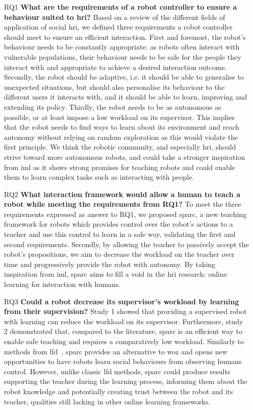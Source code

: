 \begin{itemize}
	\item [RQ1] \textbf{What are the requirements of a robot controller to ensure a behaviour suited to \gls{hri}?} 
	Based on a review of the different fields of application of social \gls{hri}, we defined three requirements a robot controller should meet to ensure an efficient interaction. First and foremost, the robot's behaviour needs to be constantly appropriate: as robots often interact with vulnerable populations, their behaviour needs to be safe for the people they interact with and appropriate to achieve a desired interaction outcome. Secondly, the robot should be adaptive, i.e. it should be able to generalise to unexpected situations, but should also personalise its behaviour to the different users it interacts with, and it should be able to learn, improving and extending its policy. Thirdly, the robot needs to be as autonomous as possible, or at least impose a low workload on its supervisor. This implies that the robot needs to find ways to learn about its environment and reach autonomy without relying on random exploration as this would violate the first principle. We think the robotic community, and especially \gls{hri}, should strive toward more autonomous robots, and could take a stronger inspiration from \gls{iml} as it shows strong promises for teaching robots and could enable them to learn complex tasks such as interacting with people.
	
	\item [RQ2] \textbf{What interaction framework would allow a human to teach a robot while meeting the requirements from RQ1?}
	To meet the three requirements expressed as answer to RQ1, we proposed \gls{sparc}, a new teaching framework for robots which provides control over the robot's actions to a teacher and use this control to learn in a safe way, validating the first and second requirements. Secondly, by allowing the teacher to passively accept the robot's propositions, we aim to decrease the workload on the teacher over time and progressively provide the robot with autonomy. By taking inspiration from \gls{iml}, \gls{sparc} aims to fill a void in the \gls{hri} research: online learning for interaction with humans.
	
	\item [RQ3] \textbf{Could a robot decrease its supervisor's workload by learning from their supervision?}
	Study 1 showed that providing a supervised robot with learning can reduce the workload on its supervisor. Furthermore, study 2 demonstrated that, compared to the literature, \gls{sparc} is an efficient way to enable safe teaching and requires a comparatively low workload. Similarly to methods from \gls{lfd}~\citep{liu2014train,sequeira2016discovering}, \gls{sparc} provides an alternative to \gls{woz} and opens new opportunities to have robots learn social behaviours from observing humans control. However, unlike classic \gls{lfd} methods, \gls{sparc} could produce results supporting the teacher during the learning process, informing them about the robot knowledge and potentially creating trust between the robot and its teacher, qualities still lacking in other online learning frameworks.
	

\end{itemize}
